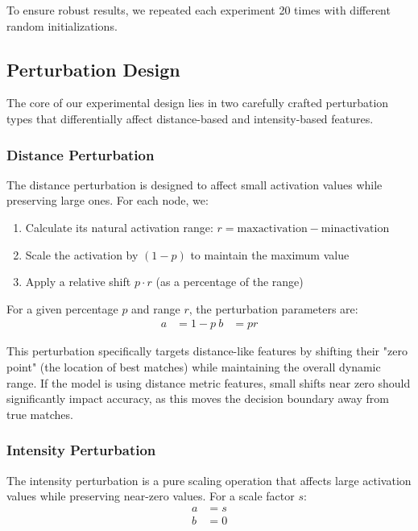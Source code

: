 To ensure robust results, we repeated each experiment 20 times with different random initializations.

\subsection{Perturbation Design}
The core of our experimental design lies in two carefully crafted perturbation types that differentially affect distance-based and intensity-based features.

\subsubsection{Distance Perturbation}
The distance perturbation is designed to affect small activation values while preserving large ones. For each node, we:
\begin{enumerate}
    \item Calculate its natural activation range: $r = \text{max}{\text{activation}} - \text{min}{\text{activation}}$
    \item Scale the activation by $(1-p)$ to maintain the maximum value
    \item Apply a relative shift $p \cdot r$ (as a percentage of the range)
\end{enumerate}

For a given percentage $p$ and range $r$, the perturbation parameters are:
\begin{align}
a &= 1 - p \label{eq:scale} \
b &= pr \label{eq:offset}
\end{align}

This perturbation specifically targets distance-like features by shifting their "zero point" (the location of best matches) while maintaining the overall dynamic range. If the model is using distance metric features, small shifts near zero should significantly impact accuracy, as this moves the decision boundary away from true matches.

\subsubsection{Intensity Perturbation}
The intensity perturbation is a pure scaling operation that affects large activation values while preserving near-zero values. For a scale factor $s$:
\begin{align}
    a &= s \\
    b &= 0
\end{align}

